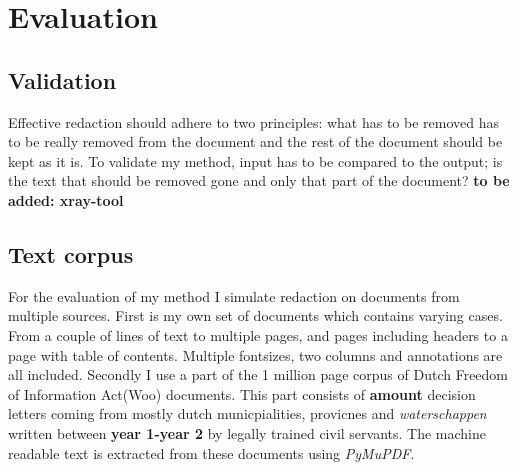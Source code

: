 \chapter{Evaluation}


\section{Validation}
Effective redaction should adhere to two principles: what has to be removed has to be really removed from the document and the rest of the document should be kept as it is. To validate my method, input has to be compared to the output; is the text that should be removed gone and only that part of the document? \textbf{to be added: xray-tool}

\section{Text corpus}
For the evaluation of my method I simulate redaction on documents from multiple sources. First is my own set of documents which contains varying cases. From a couple of lines of text to multiple pages, and pages including headers to a page with table of contents. Multiple fontsizes, two columns and annotations are all included. Secondly I use a part of the 1 million page corpus of Dutch Freedom of Information Act(Woo) documents. This part consists of \textbf{amount} decision letters coming from mostly dutch municpialities, provicnes and \textit{waterschappen} written between \textbf{year 1-year 2} by legally trained civil servants. The machine readable text is extracted from these documents using \textit{PyMuPDF}.

